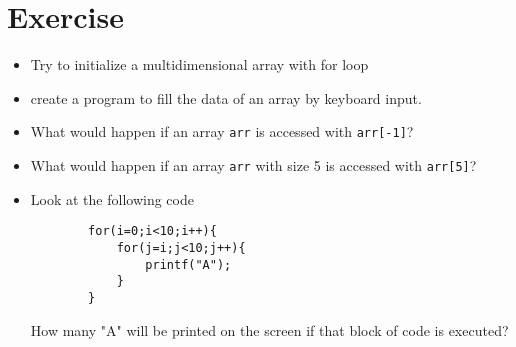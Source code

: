 \section{Exercise}
\begin{itemize}
    \item Try to initialize a multidimensional array with for loop
    \item create a program to fill the data of an array by keyboard input.
    \item What would happen if an array \verb|arr| is accessed with \verb|arr[-1]|?
    \item What would happen if an array \verb|arr| with size 5 is accessed with \verb|arr[5]|?
    \item Look at the following code
    \begin{verbatim}
        for(i=0;i<10;i++){
            for(j=i;j<10;j++){
                printf("A");
            }
        }
    \end{verbatim}
    How many "A" will be printed on the screen if that block of code is executed?
\end{itemize}
